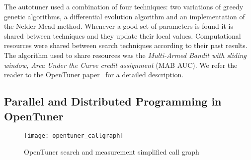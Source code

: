 The autotuner used a combination of four techniques: two variations of greedy
genetic algorithms, a differential evolution algorithm and an implementation of
the Nelder-Mead method.  Whenever a good set of parameters is found it is
shared between techniques and they update their local values. Computational
resources were shared between search techniques according to their past
results. The algorithm used to share resources was the \textit{Multi-Armed
Bandit with sliding window, Area Under the Curve credit assignment} (MAB AUC).
We refer the reader to the OpenTuner paper~\cite{ansel2014opentuner} for a
detailed description.

\subsection{Parallel and Distributed Programming in OpenTuner}
\label{sec:opentuner-parallel}

\begin{figure}[htpb]
    \centering
    \texttt{[image: opentuner\_callgraph]}
    \caption{OpenTuner search and measurement simplified call graph}
    \label{fig:ot-imp}
\end{figure}

%
%
%
%
%
